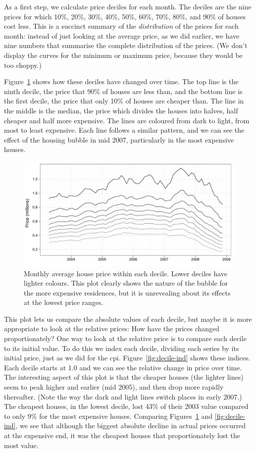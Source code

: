 \documentclass[oneside]{article}
\begin{document}
As a first step, we calculate price deciles for each month.  The deciles are the nine prices for which 10\%, 20\%, 30\%, 40\%, 50\%, 60\%, 70\%, 80\%, and 90\% of houses cost less.  This is a succinct summary of the {\it distribution} of the prices for each month: instead of just looking at the average price, as we did earlier, we have nine numbers that summarise the complete distribution of the prices.   (We don't display the curves for the minimum or maximum price, because they would be too choppy.)

Figure~\ref{fig:decile-raw} shows how these deciles have changed over time.  The top line is the ninth decile, the price that 90\% of houses are less than, and the bottom line is the first decile, the price that only 10\% of houses are cheaper than.  The line in the middle is the median, the price which divides the houses into halves, half cheaper and half more expensive.  The lines are coloured from dark to light, from most to least expensive.  Each line follows a similar pattern, and we can see the effect of the housing bubble in mid 2007, particularly in the most expensive houses.  

\begin{figure}[htbp]
  \centering
  \includegraphics[width=0.75\linewidth]{decile-raw}
  \caption{Monthly average house price within each decile.  Lower deciles have lighter colours.  This plot clearly shows the nature of the bubble for the more expensive residences, but it is unrevealing about its effects at the lowest price ranges. } 
  \label{fig:decile-raw}
\end{figure}

This plot lets us compare the absolute values of each decile, but maybe it is more appropriate to look at the relative prices: How have the prices changed proportionately?  One way to look at the relative price is to compare each decile to its initial value.  To do this we index each decile, dividing each series by its initial price, just as we did for the {\sc cpi}. Figure~\ref{fig:decile-ind} shows these indices.  Each decile starts at 1.0 and we can see the relative change in price over time.  The interesting aspect of this plot is that the cheaper houses (the lighter lines) seem to peak higher and earlier (mid 2005), and then drop more rapidly thereafter. (Note the way the dark and light lines switch places in early 2007.) The cheapest houses, in the lowest decile, lost 43\% of their 2003 value compared to only 9\% for the most expensive houses. Comparing Figures~\ref{fig:decile-raw} and \ref{fig:decile-ind}, we see that although the biggest absolute decline in actual prices occurred at the expensive end, it was the cheapest houses that proportionately lost the most value. 
\end{document}
